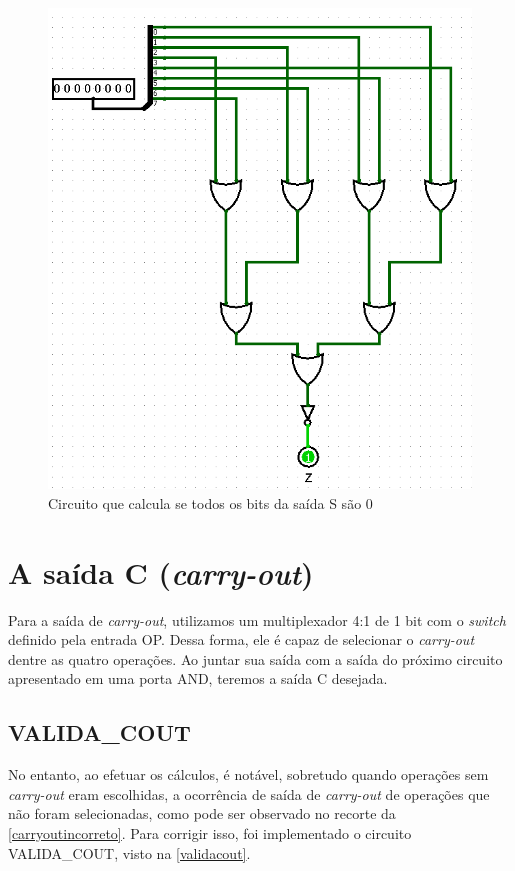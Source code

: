 \documentclass[
	12pt,				%
	openright,			%
	twoside,			%
	a4paper,			%
	english,			%
	french,				%
	spanish,			%
	brazil,				%
	]{abntex2}
\begin{document}
\begin{figure}[H]
	\begin{center}
	    \includegraphics[scale=0.5]{imagens/ZERO.png}
	\end{center}
\caption{\label{saidaZ}Circuito que calcula se todos os bits da saída S são 0}
\end{figure}

\section{A saída C (\textit{carry-out})}

Para a saída de \textit{carry-out}, utilizamos um multiplexador 4:1 de 1 bit com o \textit{switch} definido pela entrada OP. Dessa forma, ele é capaz de selecionar o \textit{carry-out} dentre as quatro operações. Ao juntar sua saída com a saída do próximo circuito apresentado em uma porta AND, teremos a saída C desejada.

\subsection{VALIDA\_COUT}

No entanto, ao efetuar os cálculos, é notável, sobretudo quando operações sem \textit{carry-out} eram escolhidas, a ocorrência de saída de \textit{carry-out} de operações que não foram selecionadas, como pode ser observado no recorte da \autoref{carryoutincorreto}. Para corrigir isso, foi implementado o circuito VALIDA\_COUT, visto na \autoref{validacout}.
\end{document}
